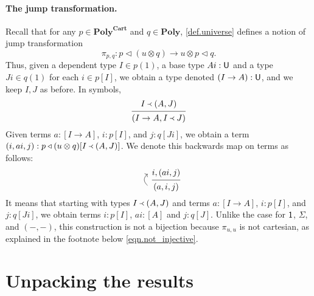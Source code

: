 \documentclass[11pt, one side, article]{memoir}
\newcommand{\upp}{\begin{tikzcd}[row sep=6pt]~\\~\ar[u, bend left=50pt, looseness=1.3, start anchor=east, end anchor=east]\end{tikzcd}}
\theoremstyle{definition}
\theoremstyle{plain}
\newcommand{\Cat}[1]{\mathbf{#1}}%
\newcommand{\tn}[1]{\textnormal{#1}}
\newcommand{\poly}{\Cat{Poly}}
\newcommand{\polycart}{\poly^{\Cat{Cart}}}
\newcommand{\0}{\textsf{0}}
\newcommand{\1}{\tn{\textsf{1}}}
\newcommand{\U}{\tn{\textsf{U}}}
\newcommand{\tri}{\mathbin{\triangleleft}}
\newcommand{\jump}{\pi}
\newcommand{\founds}{\Yleft}
\begin{document}
\paragraph{The jump transformation.}

Recall that for any $p\in\polycart$ and $q\in\poly$, \cref{def.universe} defines a notion of jump transformation
\[\jump_{p,q}\colon p\tri (u\otimes q)\to u\otimes p\tri q.\]
Thus, given a dependent type $I\in p(1)$, a base type $A i:\U$ and a type $J i\in q(1)$ for each $i\in p[I]$, we obtain a type denoted $(I\to A):\U$, and we keep $I,J$ as before. In symbols,
\begin{equation*}
  \begin{prooftree}
    \Hypo{I\founds (A, J)}
    \Infer1{(I\to A, I\founds J)}
  \end{prooftree}
\end{equation*}
Given terms $a:[I\to A]$, $i:p[I]$, and $j:q[Ji]$, we obtain a term $(i,a i, j):p\tri(u\otimes q)[I\founds (A,J)]$. We denote this backwards map on terms as follows:
\[
  \begin{prooftree}
    \Hypo{i, (a i, j)}
    \Infer[left label={$\upp$}]1{(a,i,j)}
  \end{prooftree}
\]
It means that starting with types $I\founds(A,J)$ and terms $a:[I\to A]$, $i:p[I]$, and $j:q[Ji]$, we obtain terms $i:p[I]$, $ai:[A]$ and $j:q[J]$.
Unlike the case for $\1$, $\Sigma$, and $(-,-)$, this construction is not a bijection because $\jump_{u,u}$ is not cartesian, as explained in the footnote below \cref{eqn.not_injective}.

\section{Unpacking the results}
\end{document}
